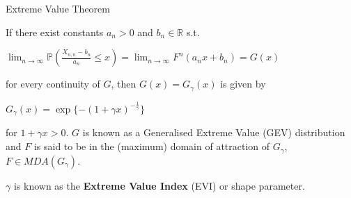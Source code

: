 \documentclass[notes]{beamer}
\begin{document}

\begin{frame}{Extreme Value Theorem}

If there exist constants $a_n >0$ and $b_n \in \mathbb{R}$ s.t. \newline

\begin{center}$\displaystyle \lim_{n \rightarrow \infty} \mathbb{P}\left(\frac{X_{n,n} - b_n}{a_n} \le x\right) =  \lim_{n \rightarrow \infty} F^n (a_n x + b_n) = G(x)$ \end{center}

for every continuity of $G$, then $G(x) = G_\gamma(x)$ is given by

\begin{center} $G_\gamma(x) = \exp\{-(1+\gamma x)^{-\frac{1}{\gamma}}\} $ \end{center}

for $1 + \gamma x >0$. $G$ is known as a Generalised Extreme Value (GEV) distribution and $F$ is said to be in the (maximum) domain of attraction of $G_\gamma$, $F \in MDA(G_\gamma)$. \newline


$\gamma$ is known as the \textbf{Extreme Value Index} (EVI) or shape parameter.


\end{frame}
\end{document}
